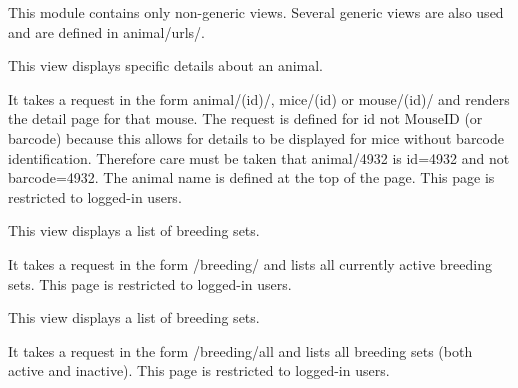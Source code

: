 \documentclass[letterpaper,10pt,english]{sphinxmanual}
\begin{document}
This module contains only non-generic views.  Several generic views are also used and are defined in animal/urls/.

\begin{fulllineitems}
\label{api:animal.views.animal_detail}
This view displays specific details about an animal.

It takes a request in the form animal/(id)/, mice/(id) or mouse/(id)/ and renders the detail page for that mouse.  The request is defined for id not MouseID (or barcode) because this allows for details to be displayed for mice without barcode identification.
Therefore care must be taken that animal/4932 is id=4932 and not barcode=4932.  The animal name is defined at the top of the page.
This page is restricted to logged-in users.

\end{fulllineitems}


\begin{fulllineitems}
\label{api:animal.views.breeding}
This view displays a list of breeding sets.

It takes a request in the form /breeding/ and lists all currently active breeding sets.
This page is restricted to logged-in users.

\end{fulllineitems}


\begin{fulllineitems}
\label{api:animal.views.breeding_all}
This view displays a list of breeding sets.

It takes a request in the form /breeding/all and lists all breeding sets (both active and inactive).
This page is restricted to logged-in users.

\end{fulllineitems}

\end{document}
